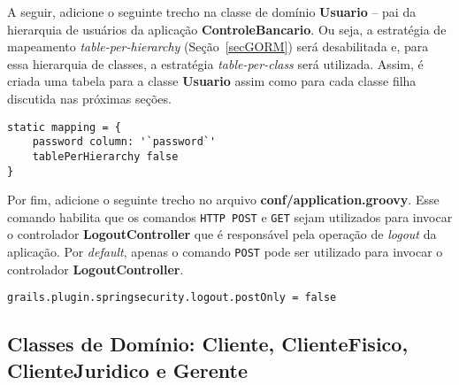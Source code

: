 \vspace{0.5cm}

A seguir, adicione  o seguinte trecho na classe de domínio  {\bf Usuario} -- pai
da  hierarquia de  usuários  da  aplicação {\bf  ControleBancario}.  Ou seja,  a
estratégia  de mapeamento  {\it table-per-hierarchy}  (Seção~\ref{secGORM}) será
desabilitada   e,  para   essa  hierarquia   de  classes,   a   estratégia  {\it
  table-per-class} será  utilizada.  Assim,  é criada uma  tabela para  a classe
{\bf Usuario} assim como para cada classe filha discutida nas próximas seções.

\vspace{0.5cm}

\begin{cBox}
\begin{small}
\begin{verbatim}
static mapping = {
    password column: '`password`'
    tablePerHierarchy false
}
\end{verbatim}
\end{small}
\end{cBox}

\vspace{0.5cm}


Por     fim,    adicione     o     seguinte    trecho     no    arquivo     {\bf
  conf/application.groovy}. Esse  comando habilita que  os comandos \texttt{HTTP
  POST}  e  \texttt{GET}  sejam  utilizados  para  invocar  o  controlador  {\bf
  LogoutController}  que  é  responsável   pela  operação  de  {\it  logout}  da
aplicação. Por {\it default}, apenas  o comando \texttt{POST} pode ser utilizado
para invocar o controlador {\bf LogoutController}. 

\vspace{0.5cm}

\begin{cBox}
\begin{small}
\begin{verbatim}
grails.plugin.springsecurity.logout.postOnly = false
\end{verbatim}
\end{small}
\end{cBox}

\newpage

\subsection{Classes de Domínio: Cliente, ClienteFisico, ClienteJuridico e Gerente}

